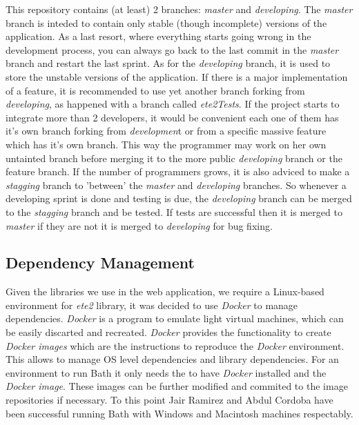 \documentclass[10pt]{article}
\begin{document}
This repository contains (at least) 2 branches: \textit{master} and \textit{developing}. The \textit{master} branch is inteded to contain only stable (though incomplete) versions of the application. As a last resort, where everything starts going wrong in the development process, you can always go back to the last commit in the \textit{master} branch and restart the last sprint. As for the \textit{developing} branch, it is used to store the unstable versions of the application.
If there is a major implementation of a feature, it is recommended to use yet another branch forking from \textit{developing}, as happened with a branch called \textit{ete2Tests}.
If the project starts to integrate more than 2 developers, it would be convenient each one of them has it's own branch forking from \textit{developmen}t or from a specific massive feature which has it's own branch. This way the programmer may work on her own untainted branch before merging it to the more public \textit{developing} branch or the feature branch.
If the number of  programmers grows, it is also adviced to make a \textit{stagging} branch to 'between' the \textit{master} and \textit{developing} branches. So whenever a developing sprint is done and testing is due, the \textit{developing} branch can be merged to the \textit{stagging} branch and be tested. If tests are successful then it is merged to \textit{master} if they are not it is merged to \textit{developing} for bug fixing.
 
 \subsection{Dependency Management}
 
Given the libraries we use in the web application, we require a Linux-based environment for \textit{ete2} library, it was decided to use \textit{Docker} to manage dependencies. \textit{Docker} is a program to emulate light virtual machines, which can be easily discarted and recreated. \textit{Docker} provides the functionality to create \textit{Docker images} which are the instructions to reproduce the \textit{Docker} environment. 
This allows to manage OS level dependencies and library dependencies. For an environment to run Bath it only needs the to have \textit{Docker} installed and the \textit{Docker image}. These images can be further modified and commited to the image repositories if necessary.
To this point Jair Ramirez and Abdul Cordoba have been successful running Bath with Windows and Macintosh machines respectably.
 
\end{document}

